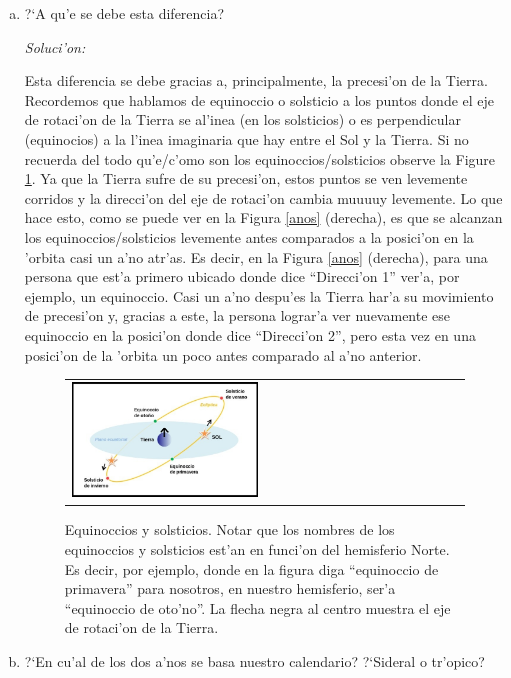 \documentclass{article}
\begin{document}
\begin{enumerate} [a)]
Notar entonces que los a'nos siderales son levemente mayores a los a'nos tr'opicos en duraci'on. Una diferencia esquem'atica de esto puede ser apreciada en la Figura \ref{anos}.

\item ?`A qu'e se debe esta diferencia?

\emph{Soluci'on:}

Esta diferencia se debe gracias a, principalmente, la precesi'on de la Tierra. Recordemos que hablamos de  equinoccio o solsticio a los puntos donde el eje de rotaci'on de la Tierra se al'inea  (en los solsticios) o es perpendicular (equinocios) a la l'inea imaginaria que hay entre el Sol y la Tierra. Si no recuerda del todo qu'e/c'omo son los equinoccios/solsticios observe la Figure \ref{ec_celeste}. Ya que la Tierra sufre de su precesi'on, estos puntos se ven levemente corridos y la direcci'on del eje de rotaci'on cambia muuuuy levemente. Lo que hace esto, como se puede ver en la Figura \ref{anos} (derecha), es que se alcanzan los equinoccios/solsticios levemente antes comparados a la posici'on en la 'orbita casi un a'no atr'as. Es decir, en la Figura \ref{anos} (derecha), para una persona que est'a primero ubicado donde dice ``Direcci'on 1'' ver'a, por ejemplo, un equinoccio. Casi un a'no despu'es la Tierra har'a su movimiento de precesi'on y, gracias a este, la persona lograr'a ver nuevamente ese equinoccio en la posici'on donde dice ``Direcci'on 2'', pero esta vez en una posici'on de la 'orbita un poco antes comparado al a'no anterior. 

\begin{figure}[!ht]
\begin{center}
\begin{tabular}{ll}
  \includegraphics[width=0.5\textwidth]{ec_celeste_2.jpg} 
\end{tabular}
\caption{{\small Equinoccios y solsticios. Notar que los nombres de los equinoccios y solsticios est'an en funci'on del hemisferio Norte. Es decir, por ejemplo, donde en la figura diga ``equinoccio de primavera'' para nosotros, en nuestro hemisferio, ser'a ``equinoccio de oto'no''. La flecha negra al centro muestra el eje de rotaci'on de la Tierra.}}\label{ec_celeste}
\end{center} 
\end{figure}

\item ?`En cu'al de los dos a'nos se basa nuestro calendario? ?`Sideral o tr'opico?
\end{enumerate}
\end{document}
